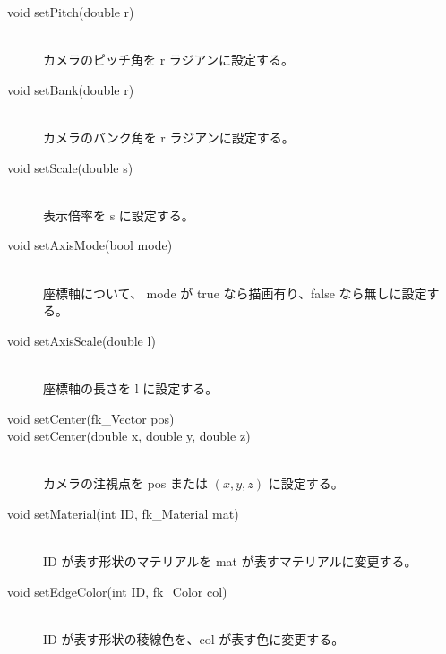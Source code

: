 \begin{description}
 \item[\hspace*{0.6cm}void setPitch(double r)] ~ \\
	カメラのピッチ角を r ラジアンに設定する。\\

 \item[\hspace*{0.6cm}void setBank(double r)] ~ \\
	カメラのバンク角を r ラジアンに設定する。\\

 \item[\hspace*{0.6cm}void setScale(double s)] ~ \\
	表示倍率を s に設定する。\\

 \item[\hspace*{0.6cm}void setAxisMode(bool mode)] ~ \\
	座標軸について、
	mode が true なら描画有り、false なら無しに設定する。\\

 \item[\hspace*{0.6cm}void setAxisScale(double l)] ~ \\
	座標軸の長さを l に設定する。\\

 \item[\hspace*{0.6cm}void setCenter(fk\_Vector pos)]
 \item[\hspace*{0.6cm}void setCenter(double x, double y, double z)] ~ \\
	カメラの注視点を pos または \((x, y, z)\) に設定する。\\

 \item[\hspace*{0.6cm}void setMaterial(int ID, fk\_Material mat)] ~ \\
	ID が表す形状のマテリアルを mat が表すマテリアルに変更する。\\

 \item[\hspace*{0.6cm}void setEdgeColor(int ID, fk\_Color col)] ~ \\
	ID が表す形状の稜線色を、col が表す色に変更する。\\


\end{description}

